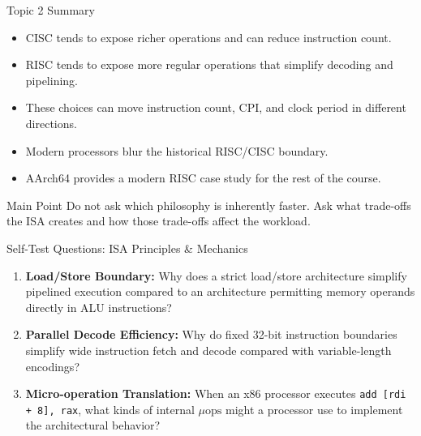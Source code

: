 \documentclass[aspectratio=169,11pt,t]{beamer}
\newcommand{\key}[1]{\textbf{#1}}
\newcommand{\code}[1]{\texttt{#1}}
\begin{document}

\begin{frame}{Topic 2 Summary}

\begin{itemize}\setlength{\itemsep}{6pt}
  \item CISC tends to expose richer operations and can reduce instruction count.
  \item RISC tends to expose more regular operations that simplify decoding and pipelining.
  \item These choices can move instruction count, CPI, and clock period in different directions.
  \item Modern processors blur the historical RISC/CISC boundary.
  \item AArch64 provides a modern RISC case study for the rest of the course.
\end{itemize}

\vspace{0.2cm}

\begin{block}{Main Point}
Do not ask which philosophy is inherently faster. Ask what trade-offs the ISA
creates and how those trade-offs affect the workload.
\end{block}

\end{frame}







\begin{frame}{Self-Test Questions: ISA Principles \& Mechanics}
\vfill
\begin{enumerate}\setlength{\itemsep}{12pt}
  \item \key{Load/Store Boundary:} Why does a strict load/store architecture simplify pipelined execution compared to an architecture permitting memory operands directly in ALU instructions?
  
  \item \key{Parallel Decode Efficiency:} Why do fixed 32-bit instruction boundaries simplify wide instruction fetch and decode compared with variable-length encodings?
  
  \item \key{Micro-operation Translation:} When an x86 processor executes \code{add [rdi + 8], rax}, what kinds of internal $\mu\text{ops}$ might a processor use to implement the architectural behavior?
\end{enumerate}
\vfill
\end{frame}
\end{document}
